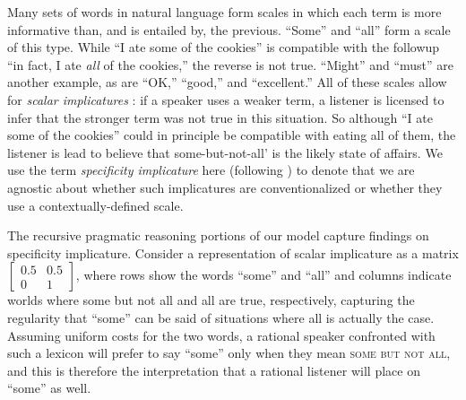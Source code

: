 \documentclass{article} %
\begin{document}
Many sets of words in natural language form scales in which each term
is more informative than, and is entailed by, the previous. ``Some'' and ``all'' form a scale of this
type. While ``I ate some of the cookies'' is compatible with the
followup ``in fact, I ate {\it all} of the cookies,'' the reverse is
not true. ``Might'' and ``must'' are another example, as are ``OK,''
``good,'' and ``excellent.'' All of these scales allow for {\it scalar
  implicatures} \cite{grice1975}: if a speaker uses a weaker term, a
listener is licensed to infer that the stronger term was not true in
this situation. So although ``I ate some of the cookies'' could in
principle be compatible with eating {\sc all} of them, the listener is lead
to believe that {\sc some-but-not-all}' is the likely state of
affairs. We use the term {\it specificity implicature} here (following
\cite{bergen2012}) to denote that we are agnostic about whether such
implicatures are conventionalized or whether they use a
contextually-defined scale.

The recursive pragmatic reasoning portions of our model capture
findings on specificity implicature. Consider a representation of
scalar implicature as a matrix $\left[
    \begin{array}{cc}
      0.5 & 0.5 \\
      0 & 1
    \end{array}
  \right]$, where rows show the words ``some'' and ``all'' and columns
  indicate worlds where {\sc some but not all} and {\sc all} are true,
  respectively, capturing the regularity that ``some'' can be said of
  situations where {\sc all} is actually the case. Assuming uniform
  costs for the two words, a rational speaker confronted with such a
  lexicon will prefer to say ``some'' only when they mean \textsc{some
    but not all}, and this is therefore the interpretation that a
  rational listener will place on ``some'' as well.

  
\end{document}
